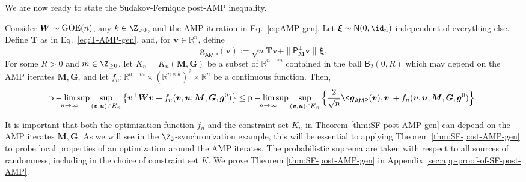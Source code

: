 \documentclass[]{article}
\def\bW{{\boldsymbol W}}
\def\normal{{\sf N}}
\def\bv{{\boldsymbol V}}
\def\bM{{\boldsymbol M}}
\def\bT{\boldsymbol{T}}
\def\proj{{\mathsf P}}
\def\bu{{\boldsymbol u}}
\def\bg{{\boldsymbol g}}
\def\bv{{\boldsymbol v}}
\def\bxi{{\boldsymbol \xi}}
\def\reals{{\mathbb R}}
\def\bW{{\boldsymbol W}}
\def\bG{{\boldsymbol G}}
\def\bv{{\boldsymbol v}}
\def\proj{{\mathsf P}}
\def\normal{{\sf N}}
\def\bu{{\boldsymbol u}}
\def\bg{{\boldsymbol g}}
\def\GOE{{\rm GOE}}
\def\sB{\mathsf{B}}
\def\AMP{\mathsf{AMP}}
\DeclareMathOperator*{\plimsup}{p-lim\,sup}
\begin{document}
We are now ready to state the Sudakov-Fernique post-AMP inequality.
\begin{theorem}
\label{thm:SF-post-AMP-gen}
    Consider $\bW \sim \GOE(n)$, any $k \in \Z_{>0}$,
    and the AMP iteration in Eq.~\eqref{eq:AMP-gen}.
    Let $\bxi \sim \normal(0,\id_n)$ independent of everything else.
    Define $\bT$ as in Eq.~\eqref{eq:T-AMP-gen}, 
    and, for $\bv \in \reals^n$, define
    \begin{equation}
        \bg_{\AMP}(\bv)
            := 
            \sqrt{n} \bT \bv 
            + 
            \| \proj_{\bM}^\perp \bv \| \bxi.
    \end{equation}    
    For some $R > 0$ and $m \in \Z_{\geq 0}$,
    let $K_n = K_n(\bM,\bG)$ be a subset of $\reals^{n + m}$ contained in the ball $\sB_2(0,R)$ which may depend on the AMP iterates $\bM,\bG$, 
    and let $f_n: \reals^{n+m} \times (\reals^{n \times k})^2 \times \reals^n$ be a continuous function.
    Then,
    \begin{equation}
        \plimsup_{n \rightarrow \infty} 
        \sup_{(\bv,\bu) \in K_n} \big\{ \bv^\top \bW \bv + f_n(\bv,\bu;\bM,\bG,\bg^0) \big\}
        \leq 
        \plimsup_{n \rightarrow \infty} 
        \sup_{(\bv,\bu) \in K_n} \Big\{ \frac{2}{\sqrt{n}}\< \bg_{\AMP}(\bv) , \bv \> + f_n(\bv,\bu;\bM,\bG,\bg^0) \Big\}.
    \end{equation}
\end{theorem}
\noindent It is important that both the optimization function $f_n$ and the constraint set $K_n$ in Theorem \ref{thm:SF-post-AMP-gen} can depend on the AMP iterates $\bM,\bG$. 
As we will see in the $\Z_2$-synchronization example,
this will be essential to applying Theorem \ref{thm:SF-post-AMP-gen} to probe local properties of an optimization around the AMP iterates.
The probabilistic suprema are taken with respect to all sources of randomness, including in the choice of constraint set $K$.
We prove Theorem \ref{thm:SF-post-AMP-gen} in Appendix \ref{sec:app-proof-of-SF-post-AMP}.
\end{document}
